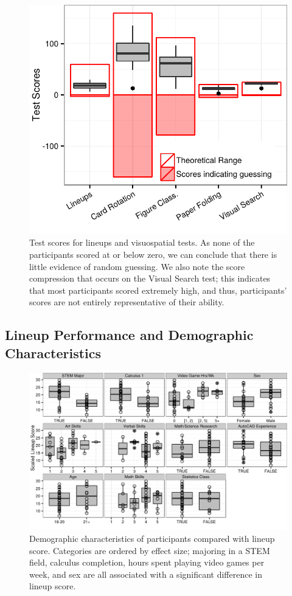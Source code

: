 \documentclass[11pt]{isuthesis}\usepackage[]{graphicx}\usepackage[]{color}
\begin{document}
\begin{figure}[ht]\centering
\includegraphics[width=.6\linewidth]{fig-ResultsScaledScores-1}
\caption{Test scores for lineups and visuospatial tests. As none of the participants scored at or below zero, we can conclude that there is little evidence of random guessing. We also note the score compression that occurs on the Visual Search test; this indicates that most participants scored extremely high, and thus, participants' scores are not entirely representative of their ability. \label{fig:Scores}}
\end{figure}
% 



\subsection{Lineup Performance and Demographic Characteristics}


\begin{figure}[h!tb]\centering
\includegraphics[width=.85\linewidth]{fig-VisReasoningCategorical-1}
\caption[Visual Aptitude Study Results]{Demographic characteristics of participants compared with lineup score. Categories are ordered by effect size; majoring in a STEM field, calculus completion, hours spent playing video games per week, and sex are all associated with a significant difference in lineup score. }\label{fig:visualaptitudecat}
\end{figure}
\end{document}
